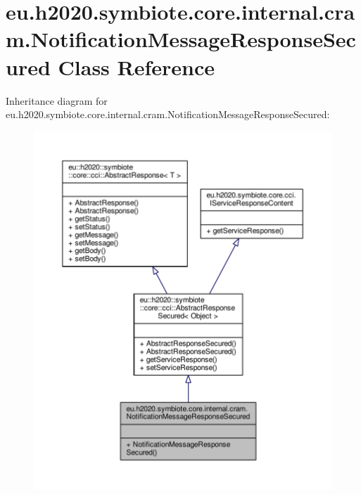 \hypertarget{classeu_1_1h2020_1_1symbiote_1_1core_1_1internal_1_1cram_1_1NotificationMessageResponseSecured}{}\section{eu.\+h2020.\+symbiote.\+core.\+internal.\+cram.\+Notification\+Message\+Response\+Secured Class Reference}
\label{classeu_1_1h2020_1_1symbiote_1_1core_1_1internal_1_1cram_1_1NotificationMessageResponseSecured}


Inheritance diagram for eu.\+h2020.\+symbiote.\+core.\+internal.\+cram.\+Notification\+Message\+Response\+Secured\+:
\nopagebreak
\begin{figure}[H]
\begin{center}
\leavevmode
\includegraphics[width=350pt]{classeu_1_1h2020_1_1symbiote_1_1core_1_1internal_1_1cram_1_1NotificationMessageResponseSecured__inherit__graph}
\end{center}
\end{figure}


